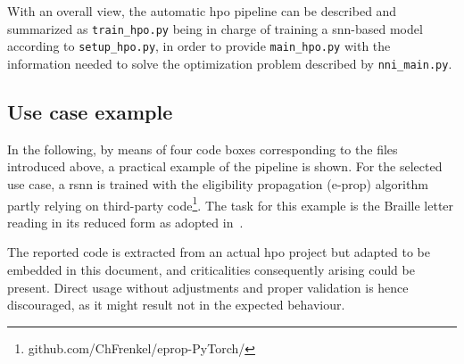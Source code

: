 With an overall view, the automatic \gls{hpo} pipeline can be described and summarized as \texttt{train\_hpo.py} being in charge of training a \gls{snn}-based model according to \texttt{setup\_hpo.py}, in order to provide \texttt{main\_hpo.py} with the information needed to solve the optimization problem described by \texttt{nni\_main.py}.


\subsection{Use case example}

In the following, by means of four code boxes corresponding to the files introduced above, a practical example of the pipeline is shown.
For the selected use case, a \gls{rsnn} is trained with the eligibility propagation (e-prop) algorithm~\cite{Bellec2020} partly relying on third-party code\footnote{github.com/ChFrenkel/eprop-PyTorch/}.
The task for this example is the Braille letter reading in its reduced form as adopted in~\cite{pedersen_neuromorphic_2024}.

The reported code is extracted from an actual \gls{hpo} project but adapted to be embedded in this document, and criticalities consequently arising could be present. Direct usage without adjustments and proper validation is hence discouraged, as it might result not in the expected behaviour.
\newline

